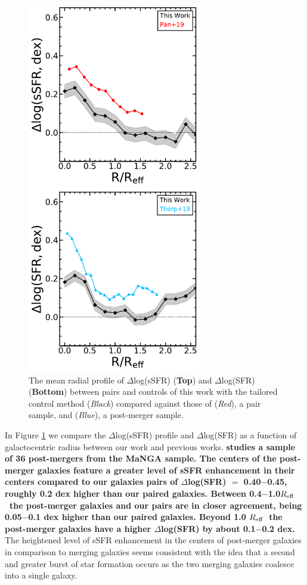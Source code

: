\documentclass[iop,revtex4,twocolumn,apj,numberedappendix,appendixfloats]{emulateapj}
\newcommand{\reff}{$R_{\rm eff}$}
\begin{document}
\begin{figure}
\centering
\includegraphics[width=3in]{fig/prof_comp.pdf}
\caption[]{The mean radial profile of $\Delta$log(sSFR) (\textbf{Top}) and $\Delta$log(SFR) (\textbf{Bottom}) between pairs and controls of this work with the tailored control method ({\it Black}) compared against those of \citet{Pan:2019} ({\it Red}), a pair sample, and \citet{Thorp:2019} ({\it Blue}), a post-merger sample.}
\label{fig:prof_comp}
\end{figure}

In Figure \ref{fig:prof_comp} we compare the $\Delta$log(sSFR) profile and $\Delta$log(SFR) as a function of galactocentric radius between our work and previous works. \textbf{\citet{Thorp:2019} studies a sample of 36 post-mergers from the MaNGA sample. The centers of the post-merger galaxies feature a greater level of sSFR enhancement in their centers compared to our galaxies pairs of $\Delta$log(SFR) $=$ 0.40$-$0.45, roughly 0.2 dex higher than our paired galaxies. Between 0.4$-$1.0\reff\ the post-merger galaxies and our pairs are in closer agreement, being 0.05$-$0.1 dex higher than our paired galaxies. Beyond 1.0 \reff\ the post-merger galaxies have a higher $\Delta$log(SFR) by about 0.1$-$0.2 dex.} The heightened level of sSFR enhancement in the centers of post-merger galaxies in comparison to merging galaxies seems consistent with the idea that a second and greater burst of star formation occurs as the two merging galaxies coalesce into a single galaxy. 
\end{document}

